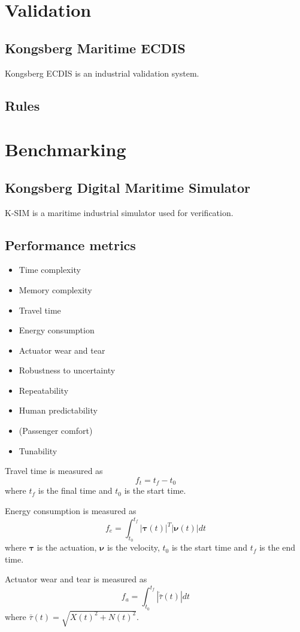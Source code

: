 \section{Validation}
\subsection{Kongsberg Maritime ECDIS}
Kongsberg ECDIS is an industrial validation system.

\subsection{Rules}


\section{Benchmarking}
\subsection{Kongsberg Digital Maritime Simulator}
K-SIM is a maritime industrial simulator used for verification. 

\subsection{Performance metrics}
\begin{itemize}
  \item Time complexity
  \item Memory complexity
  \item Travel time
  \item Energy consumption
  \item Actuator wear and tear
  \item Robustness to uncertainty
  \item Repeatability
  \item Human predictability
  \item (Passenger comfort)
  \item Tunability
\end{itemize}

Travel time is measured as
\begin{equation}
	f_t = t_f - t_0
\end{equation}
where $t_f$ is the final time and $t_0$ is the start time.

Energy consumption is measured as
\begin{equation}
	\label{eq:metric_energy}
	f_e = \int_{t_0}^{t_f} |\boldsymbol{\tau}(t)|^T|\boldsymbol{\nu}(t)|dt
\end{equation}
where $\boldsymbol{\tau}$ is the actuation, $\boldsymbol{\nu}$ is the velocity, $t_0$ is the start time and $t_f$ is the end time. 


Actuator wear and tear is measured as
\begin{equation}
	\label{eq:metric_actuator}
	f_a = \int_{t_0}^{t_f} |\dot{\bar{\tau}}(t)| dt
\end{equation}
where $\bar{\tau}(t) = \sqrt{X(t)^2+N(t)^2}$.

